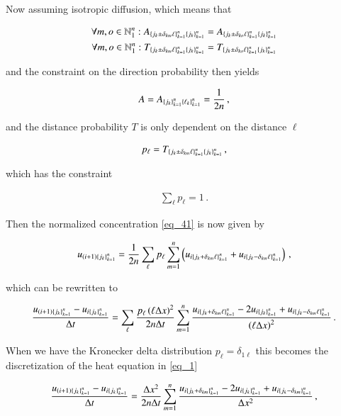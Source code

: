 \documentclass[11pt,english,a4paper]{article}
\begin{document}
\begin{flushleft}
Now assuming isotropic diffusion, which means that

\begin{align*}
\forall m,o\in \mathbb{N}_1^n : A_{\left\lbrace{j_k\pm\delta_{km} \ell}\right\rbrace_{k=1}^n\left\lbrace{j_k}\right\rbrace_{k=1}^n} &= A_{\left\lbrace{j_k\pm\delta_{ko} \ell}\right\rbrace_{k=1}^n\left\lbrace{j_k}\right\rbrace_{k=1}^n} \\
\forall m,o\in \mathbb{N}_1^n : T_{\left\lbrace{j_k\pm\delta_{km} \ell}\right\rbrace_{k=1}^n\left\lbrace{j_k}\right\rbrace_{k=1}^n} &= T_{\left\lbrace{j_k\pm\delta_{ko} \ell}\right\rbrace_{k=1}^n\left\lbrace{j_k}\right\rbrace_{k=1}^n}
\end{align*}

and the constraint on the direction probability then yields

\begin{align}
A = A_{\left\lbrace{j_k}\right\rbrace_{k=1}^n\left\lbrace{\ell_k}\right\rbrace_{k=1}^n} = \frac{1}{2n}\,,
\label{eq_44}
\end{align}

and the distance probability $T$ is only dependent on the distance $\ell$

\begin{align*}
p_\ell = T_{\left\lbrace{j_k\pm\delta_{km} \ell}\right\rbrace_{k=1}^n\left\lbrace{j_k}\right\rbrace_{k=1}^n}\,,
\end{align*}

which has the constraint

\begin{align*}
\sum_{\ell} p_\ell = 1\,.
\end{align*}

Then the normalized concentration \eqref{eq_41} is now given by

\begin{align*}
u_{(i+1)\left\lbrace{j_k}\right\rbrace_{k=1}^n} = \frac{1}{2n}\sum_\ell p_\ell\sum_{m=1}^n \left({u_{i\left\lbrace{j_k+\delta_{km}\ell}\right\rbrace_{k=1}^n} + u_{i\left\lbrace{j_k-\delta_{km}\ell}\right\rbrace_{k=1}^n}}\right) \,,
\end{align*}

which can be rewritten to

\begin{align}
\frac{u_{(i+1)\left\lbrace{j_k}\right\rbrace_{k=1}^n}-u_{i\left\lbrace{j_k}\right\rbrace_{k=1}^n}}{\Delta t} = \sum_{\ell}\frac{p_\ell \left({\ell \Delta x}\right)^2}{2n\Delta t}\sum_{m=1}^n\frac{u_{i\left\lbrace{j_k+\delta_{km}\ell}\right\rbrace_{k=1}^n} - 2 u_{i\left\lbrace{j_k}\right\rbrace_{k=1}^n} + u_{i\left\lbrace{j_k-\delta_{km}\ell}\right\rbrace_{k=1}^n}}{\left({\ell\Delta x}\right)^2} \,.
\label{eq_45}
\end{align}

When we have the Kronecker delta distribution $p_\ell = \delta_{1\ell}$ this becomes the discretization of the heat equation in \eqref{eq_1} 

\begin{align*}
\frac{u_{(i+1)\left\lbrace{j_k}\right\rbrace_{k=1}^n}-u_{i\left\lbrace{j_k}\right\rbrace_{k=1}^n}}{\Delta t} = \frac{\Delta x^2}{2n\Delta t}\sum_{m=1}^n\frac{u_{i\left\lbrace{j_k+\delta_{km}}\right\rbrace_{k=1}^n} - 2 u_{i\left\lbrace{j_k}\right\rbrace_{k=1}^n} + u_{i\left\lbrace{j_k-\delta_{km}}\right\rbrace_{k=1}^n}}{\Delta x^2} \,,
\end{align*}


\end{flushleft}
\end{document}
